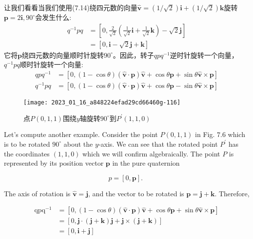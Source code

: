 让我们看看当我们使用(7.14)绕四元数的向量$\hat{\mathbf{v}}=(1 / \sqrt{2}) \mathbf{i}+(1 / \sqrt{2}) \mathbf{k}$旋转$\mathbf{p}=2 \mathbf{i}, 90^{\circ}$会发生什么:
$$
\begin{aligned}
q^{-1} p q & =\left[0, \frac{2}{\sqrt{2}}\left(\frac{1}{\sqrt{2}} \mathbf{i}+\frac{1}{\sqrt{2}} \mathbf{k}\right)-\sqrt{2} \mathbf{j}\right] \\
& =[0, \mathbf{i}-\sqrt{2} \mathbf{j}+\mathbf{k}]
\end{aligned}
$$
它将$\mathbf{p}$绕四元数的向量顺时针旋转$90^{\circ}$。因此，转子$q p q^{-1}$逆时针旋转一个向量，$q^{-1} p q$顺时针旋转一个向量:
$$
\begin{aligned}
q p q^{-1} & =[0,(1-\cos \theta)(\hat{\mathbf{v}} \cdot \mathbf{p}) \hat{\mathbf{v}}+\cos \theta \mathbf{p}+\sin \theta \hat{\mathbf{v}} \times \mathbf{p}] \\
q^{-1} p q & =[0,(1-\cos \theta)(\hat{\mathbf{v}} \cdot \mathbf{p}) \hat{\mathbf{v}}+\cos \theta \mathbf{p}-\sin \theta \hat{\mathbf{v}} \times \mathbf{p}]
\end{aligned}
$$

\begin{figure}[h!]
    \centering
    \texttt{[image: 2023\_01\_16\_a848224efad29cd66460g-116]}
    \caption[short]{点$P(0,1,1)$围绕$y$轴旋转$90^{\circ}$到$P^{\prime}(1,1,0)$}
\end{figure}





Let's compute another example. Consider the point $P(0,1,1)$ in Fig. $7.6$ which is to be rotated $90^{\circ}$ about the $y$-axis. We can see that the rotated point $P^{\prime}$ has the coordinates $(1,1,0)$ which we will confirm algebraically. The point $P$ is represented by its position vector $\mathbf{p}$ in the pure quaternion

$$
p=[0, \mathbf{p}] \text {. }
$$

The axis of rotation is $\hat{\mathbf{v}}=\mathbf{j}$, and the vector to be rotated is $\mathbf{p}=\mathbf{j}+\mathbf{k}$. Therefore,

$$
\begin{aligned}
\operatorname{qpq}^{-1} & =[0,(1-\cos \theta)(\hat{\mathbf{v}} \cdot \mathbf{p}) \hat{\mathbf{v}}+\cos \theta \mathbf{p}+\sin \theta \hat{\mathbf{v}} \times \mathbf{p}] \\
& =[0, \mathbf{j} \cdot(\mathbf{j}+\mathbf{k}) \mathbf{j}+\mathbf{j} \times(\mathbf{j}+\mathbf{k})] \\
& =[0, \mathbf{i}+\mathbf{j}]
\end{aligned}
$$

